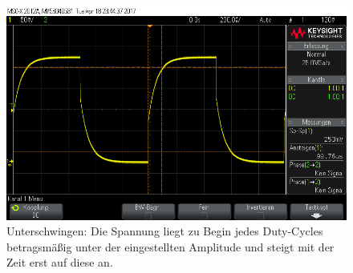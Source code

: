 \documentclass[10pt]{report}
\begin{document}
  \begin{figure}[H]
   \includegraphics[width=\textwidth]{scope_10.png}
   \caption{Unterschwingen: Die Spannung liegt zu Begin jedes Duty-Cycles betragsmäßig unter der eingestellten
   Amplitude und steigt mit der Zeit erst auf diese an.}
 \end{figure}
\end{document}
